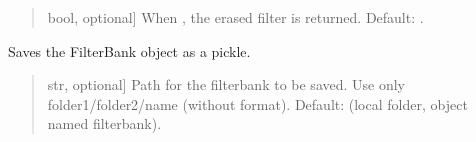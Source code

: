 \documentclass[letterpaper,10pt,english]{sphinxmanual}
\begin{document}
\begin{fulllineitems}
\begin{fulllineitems}
\begin{quote}
\begin{description}
\begin{description}
\sphinxlineitem{\sphinxstylestrong{return\_filter}}{[}bool, optional{]}
\sphinxAtStartPar
When , the erased filter is returned. Default: .

\end{description}

\end{description}\end{quote}

\end{fulllineitems}


\begin{fulllineitems}
\label{\detokenize{classes:dsptools.classes.filterbank.FilterBank.save_filterbank}}
\pysigstartsignatures
{}
\pysigstopsignatures
\sphinxAtStartPar
Saves the FilterBank object as a pickle.
\begin{quote}\begin{description}
\begin{description}
\sphinxlineitem{\sphinxstylestrong{path}}{[}str, optional{]}
\sphinxAtStartPar
Path for the filterbank to be saved. Use only folder1/folder2/name
(without format). Default: 
(local folder, object named filterbank).

\end{description}

\end{description}\end{quote}

\end{fulllineitems}



\end{fulllineitems}
\end{document}
